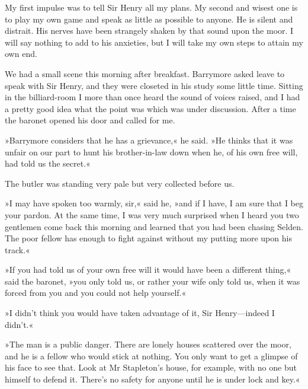 
My first impulse was to tell Sir Henry all my plans. My second and wisest one is to play my own game and speak as little as possible to anyone. He is silent and distrait. His nerves have been strangely shaken by that sound upon the moor. I will say nothing to add to his anxieties, but I will take my own steps to attain my own end.

We had a small scene this morning after breakfast. Barrymore asked leave to speak with Sir Henry, and they were closeted in his study some little time. Sitting in the billiard-room I more than once heard the sound of voices raised, and I had a pretty good idea what the point was which was under discussion. After a time the baronet opened his door and called for me.

»Barrymore considers that he has a grievance,« he said. »He thinks that it was unfair on our part to hunt his brother-in-law down when he, of his own free will, had told us the secret.«

The butler was standing very pale but very collected before us.

»I may have spoken too warmly, sir,« said he, »and if I have, I am sure that I beg your pardon. At the same time, I was very much surprised when I heard you two gentlemen come back this morning and learned that you had been chasing Selden. The poor fellow has enough to fight against without my putting more upon his track.«

»If you had told us of your own free will it would have been a different thing,« said the baronet, »you only told us, or rather your wife only told us, when it was forced from you and you could not help yourself.«

»I didn't think you would have taken advantage of it, Sir Henry—indeed I didn't.«

»The man is a public danger. There are lonely houses scattered over the moor, and he is a fellow who would stick at nothing. You only want to get a glimpse of his face to see that. Look at Mr Stapleton's house, for example, with no one but himself to defend it. There's no safety for anyone until he is under lock and key.«



